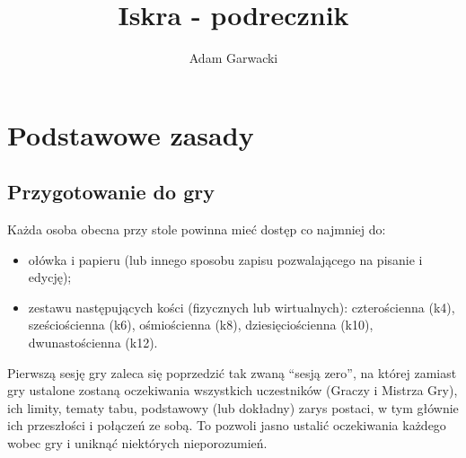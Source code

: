 \documentclass[10pt,a4paper]{book}
\author{Adam Garwacki}
\title{Iskra - podrecznik}
\begin{document}
\chapter{Podstawowe zasady}

\section{Przygotowanie do gry}
\begin{multicols}{2}

Każda osoba obecna przy stole powinna mieć dostęp co najmniej do:
\begin{itemize}
	\item ołówka i papieru (lub innego sposobu zapisu pozwalającego na pisanie i edycję);
	\item zestawu następujących kości (fizycznych lub wirtualnych):  czterościenna (k4), sześciościenna (k6), ośmiościenna (k8), dziesięciościenna (k10), dwunastościenna (k12).
\end{itemize}

Pierwszą sesję gry zaleca się poprzedzić tak zwaną “sesją zero”, na której zamiast gry ustalone zostaną oczekiwania wszystkich uczestników (Graczy i Mistrza Gry), ich limity, tematy tabu, podstawowy (lub dokładny) zarys postaci, w tym głównie ich przeszłości i połączeń ze sobą. To pozwoli jasno ustalić oczekiwania każdego wobec gry i uniknąć niektórych nieporozumień.

\end{multicols}
\end{document}
